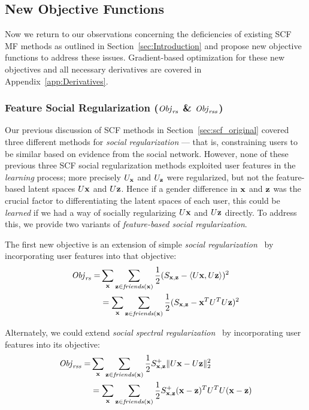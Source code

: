 \subsection{New Objective Functions}

\label{sec:newobjfun_defs}

Now we return to our observations concerning the deficiencies of
existing SCF MF methods as outlined in Section~\ref{sec:Introduction}
and propose new objective functions to address these issues.
Gradient-based optimization for these new objectives and all necessary
derivatives are covered in Appendix~\ref{app:Derivatives}.

\subsubsection{Feature Social Regularization ($\mathit{Obj}_{\mathit{rs}}$ \& $\mathit{Obj}_{\mathit{rss}}$)}
\label{sec:SocRec}

Our previous discussion of SCF methods in Section~\ref{sec:scf_original}
covered three different methods for \emph{social regularization} --- that is,
constraining users to be similar based on evidence from the social network.
However, none of these previous three SCF social regularization methods
exploited user features in the \emph{learning} process; more precisely 
$U_{\mathbf{x}}$ and $U_{\mathbf{z}}$ were regularized, but not the feature-based latent
spaces $U\mathbf{x}$ and $U\mathbf{z}$.  Hence if a gender difference in $\mathbf{x}$ and $\mathbf{z}$ was the
crucial factor to differentiating the latent spaces of each user, this could 
be \emph{learned} if we had a way of socially regularizing $U\mathbf{x}$ and $U\mathbf{z}$
directly.  To address this, we provide two variants of 
\emph{feature-based social regularization}.

The first new objective is an extension of simple 
\emph{social regularization}~\cite{lla,socinf} by incorporating user
features into that objective:
\begin{align}
\mathit{Obj}_{\mathit{rs}} = & \sum_{\mathbf{x}} \sum_{\mathbf{z} \in \mathit{friends}(\mathbf{x})} \frac{1}{2} (S_{\mathbf{x},\mathbf{z}} - \langle U\mathbf{x}, U\mathbf{z} \rangle)^2 \\
& = \sum_{\mathbf{x}} \sum_{\mathbf{z} \in \mathit{friends}(\mathbf{x})} \frac{1}{2} (S_{\mathbf{x},\mathbf{z}} - \mathbf{x}^T U^T U \mathbf{z})^2 \nonumber 
\end{align}


Alternately, we could extend \emph{social spectral
regularization}~\cite{sr,rrmf} by incorporating user features into its
objective:
\begin{align}
\mathit{Obj}_{\mathit{rss}} = & \sum_{\mathbf{x}} \sum_{\mathbf{z} \in \mathit{friends}(\mathbf{x})} \frac{1}{2} S^+_{\mathbf{x},\mathbf{z}} \| U\mathbf{x} - U\mathbf{z} \|_2^2 \\
& = \sum_{\mathbf{x}} \sum_{\mathbf{z} \in \mathit{friends}(\mathbf{x})} \frac{1}{2} S^+_{\mathbf{x},\mathbf{z}} (\mathbf{x} - \mathbf{z})^T U^T U (\mathbf{x} - \mathbf{z}) \nonumber
\end{align}

